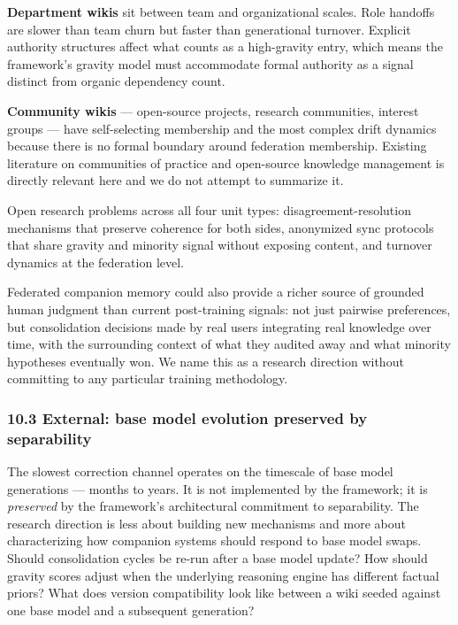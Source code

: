 \documentclass[
  11pt,
]{article}
\begin{document}
\textbf{Department wikis} sit between team and organizational scales.
Role handoffs are slower than team churn but faster than generational
turnover. Explicit authority structures affect what counts as a
high-gravity entry, which means the framework's gravity model must
accommodate formal authority as a signal distinct from organic
dependency count.

\textbf{Community wikis} --- open-source projects, research communities,
interest groups --- have self-selecting membership and the most complex
drift dynamics because there is no formal boundary around federation
membership. Existing literature on communities of practice and
open-source knowledge management is directly relevant here and we do not
attempt to summarize it.

Open research problems across all four unit types:
disagreement-resolution mechanisms that preserve coherence for both
sides, anonymized sync protocols that share gravity and minority signal
without exposing content, and turnover dynamics at the federation level.

Federated companion memory could also provide a richer source of
grounded human judgment than current post-training signals: not just
pairwise preferences, but consolidation decisions made by real users
integrating real knowledge over time, with the surrounding context of
what they audited away and what minority hypotheses eventually won. We
name this as a research direction without committing to any particular
training methodology.

\hypertarget{external-base-model-evolution-preserved-by-separability}{%
\subsubsection{10.3 External: base model evolution preserved by
separability}\label{external-base-model-evolution-preserved-by-separability}}

The slowest correction channel operates on the timescale of base model
generations --- months to years. It is not implemented by the framework;
it is \emph{preserved} by the framework's architectural commitment to
separability. The research direction is less about building new
mechanisms and more about characterizing how companion systems should
respond to base model swaps. Should consolidation cycles be re-run after
a base model update? How should gravity scores adjust when the
underlying reasoning engine has different factual priors? What does
version compatibility look like between a wiki seeded against one base
model and a subsequent generation?
\end{document}
